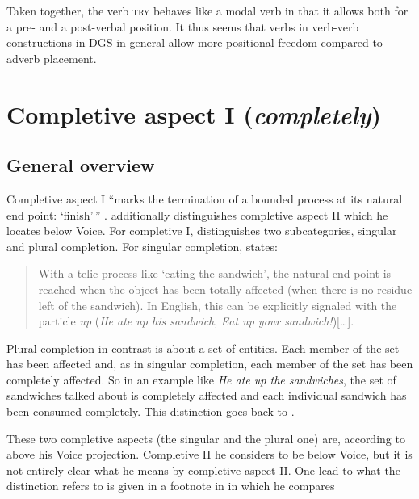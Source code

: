 \noindent Taken together, the verb \textsc{try} behaves like a modal verb in that it allows both for a pre- and a post-verbal position. It thus seems that verbs in verb-verb constructions in DGS in general allow more positional freedom compared to adverb placement.

\largerpage
\section{Completive aspect I (\textit{completely})}\label{completiveone}
\subsection{General overview}
Completive aspect I ``marks the termination of a bounded process at its natural end point: `finish'\,'' \citep[70]{cinque2006restructuring}. \citet[100--104]{cinque1999adverbs} additionally distinguishes completive aspect II which he locates below Voice. For completive I, \citet{cinque1999adverbs} distinguishes two subcategories, singular and plural completion. For singular completion, \citet[100]{cinque1999adverbs} states:

\begin{quote}
With a telic process like `eating the sandwich', the natural end point is reached when the object has been totally affected (when there is no residue left of the sandwich). In English, this can be explicitly signaled with the particle \textit{up} (\textit{He ate up his sandwich}, \textit{Eat up your sandwich!})[\dots ].
\end{quote}

\noindent Plural completion in contrast is about a set of entities. Each member of the set has been affected and, as in singular completion, each member of the set has been completely affected. So in an example like \textit{He ate up the sandwiches}, the set of sandwiches talked about is completely affected and each individual sandwich has been consumed completely. This distinction goes back to \citet[57--69]{bybee1994evolution}. 

These two completive aspects (the singular and the plural one) are, according to \citet{cinque1999adverbs} above his Voice projection. Completive II he considers to be below Voice, but it is not entirely clear what he means by completive aspect II. One lead to what the distinction refers to is given in a footnote in \citet[178]{cinque1999adverbs} in which he compares

